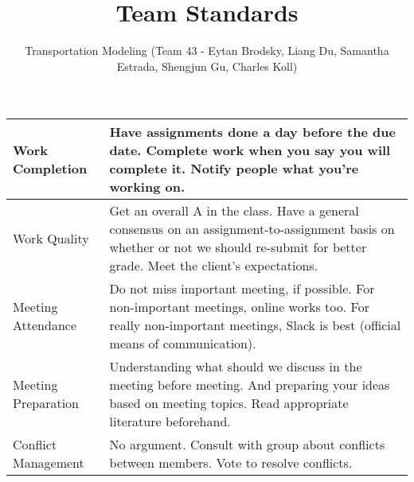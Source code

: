 \documentclass[10pt,letterpaper,draftclsnofoot,onecolumn]{IEEEtran}
\begin{document}
\author{Transportation Modeling (Team 43 - Eytan Brodsky, Liang Du, Samantha Estrada, Shengjun Gu, Charles Koll)}
\title{Team Standards}

\maketitle

\begin{tabular}{|p{1.5in}|p{5in}|} \hline
Work Completion & Have assignments done a day before the due date. Complete work when you say you will complete it. Notify people what you’re working on. \\ \hline
Work Quality & Get an overall A in the class. Have a general consensus on an assignment-to-assignment basis on whether or not we should re-submit for better grade. Meet the client’s expectations. \\ \hline
Meeting Attendance & Do not miss important meeting, if possible. For non-important meetings, online works too. For really non-important meetings, Slack is best (official means of communication). \\ \hline
Meeting Preparation & Understanding what should we discuss in the meeting before meeting. And preparing your ideas based on meeting topics. Read appropriate literature beforehand. \\ \hline
Conflict Management & No argument. Consult with group about conflicts between members. Vote to resolve conflicts. \\
\hline
\end{tabular}
\end{document}
